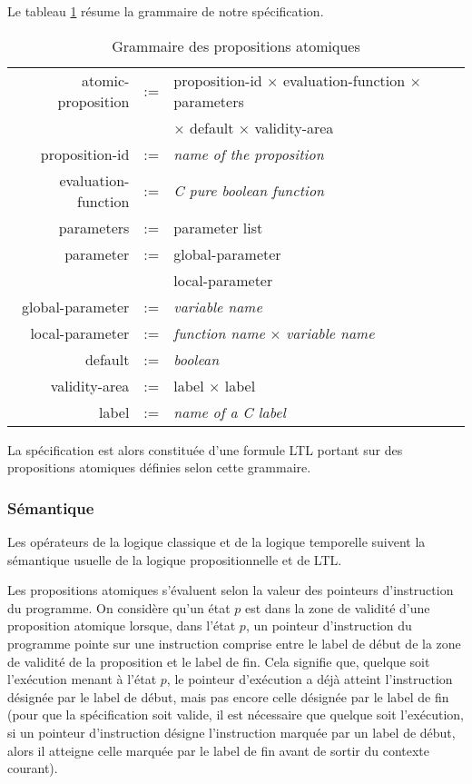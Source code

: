Le tableau \ref{tab:spe_gram} résume la grammaire de notre spécification.

\begin{table}[h]
\centering
\caption{Grammaire des propositions atomiques}
\label{tab:spe_gram}
\begin{tabular}[]{@{}rcl@{}}
\hline
atomic-proposition  & := & proposition-id \(\times\) evaluation-function \(\times\) parameters\\
                    &    & \(\times\) default \(\times\) validity-area\\
proposition-id      & := & \emph{name of the proposition}\\
evaluation-function & := & \emph{C pure boolean function}\\
parameters          & := & parameter list\\
parameter           & := & global-parameter\\
                    & \textbar{} & local-parameter\\
global-parameter    & := & \emph{variable name}\\
local-parameter     & := & \emph{function name} \(\times\) \emph{variable name}\\
default             & := & \emph{boolean}\\
validity-area       & := & label \(\times\) label\\
label               & := & \emph{name of a C label}\\
\hline
\end{tabular}
\end{table}

La spécification est alors constituée d'une formule LTL portant sur des
propositions atomiques définies selon cette grammaire.

\subsubsection{Sémantique}

Les opérateurs de la logique classique et de la logique temporelle
suivent la sémantique usuelle de la logique propositionnelle et de LTL.

Les propositions atomiques s'évaluent selon la valeur des pointeurs
d'instruction du programme. On considère qu'un état \(p\) est dans la zone de
validité d'une proposition atomique lorsque, dans l'état \(p\), un pointeur
d'instruction du programme pointe sur une instruction comprise entre le label de
début de la zone de validité de la proposition et le label de fin. Cela signifie
que, quelque soit l'exécution menant à l'état \(p\), le pointeur d'exécution a
déjà atteint l'instruction désignée par le label de début, mais pas encore celle
désignée par le label de fin (pour que la spécification soit valide, il est
nécessaire que quelque soit l'exécution, si un pointeur d'instruction désigne
l'instruction marquée par un label de début, alors il atteigne celle marquée par
le label de fin avant de sortir du contexte courant).

